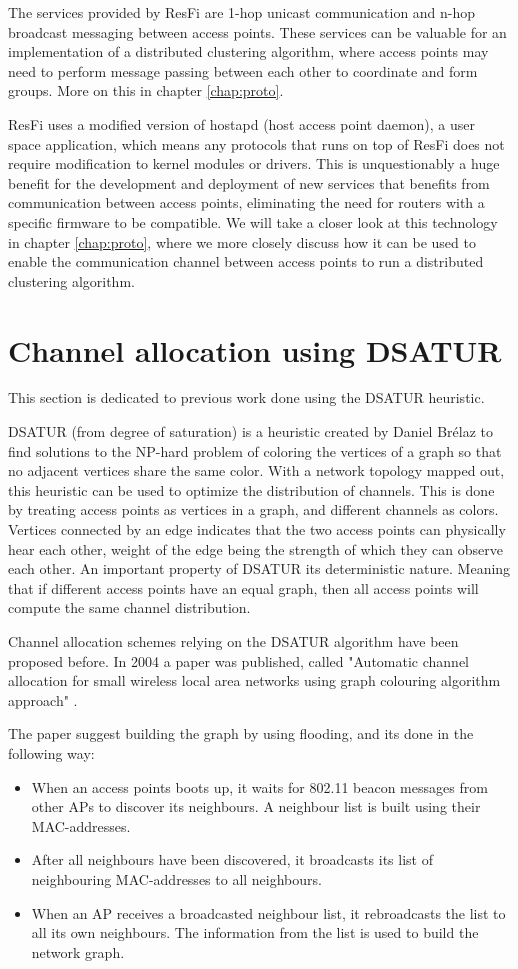The services provided by ResFi are 1-hop unicast communication and n-hop broadcast messaging between access points. These services can be valuable for an
implementation of a distributed clustering algorithm, where access points
may need to perform message passing between each other to coordinate and form groups. More on this in chapter \ref{chap:proto}.

ResFi uses a modified version of hostapd (host access point daemon), a user space application, which means any
protocols that runs on top of ResFi does not require modification to kernel modules or drivers. This is unquestionably a huge benefit for the development and deployment of
new services that benefits from communication between access points, eliminating the need for routers with a specific firmware to be compatible. 
We will take a closer look at this technology in chapter \ref{chap:proto}, where we more closely discuss how it can be used to enable the
communication channel between access points to run a distributed clustering algorithm. 


\section{Channel allocation using DSATUR} \label{chap:dsatur}
This section is dedicated to previous work done using the DSATUR heuristic.

DSATUR (from degree of saturation) is a heuristic created by Daniel Brélaz \cite{Brelaz} to find solutions to the NP-hard problem of coloring the vertices of a graph so that no adjacent vertices share the same color.  With a network topology mapped out, this heuristic can be used to optimize the distribution of channels. This is done by treating access points as vertices in a graph, and different channels as colors. Vertices connected by an edge indicates that the two access points can physically hear each other, weight of the edge being the strength of which they can observe each other.  An
important property of DSATUR its deterministic nature. Meaning that if different access points have an equal graph, then all access points will compute the same channel distribution.

Channel allocation schemes relying on the DSATUR algorithm have been proposed before. In 2004 a paper was published, called
"Automatic channel allocation for small wireless local area networks using graph colouring algorithm approach" \cite{mahonen}.

The paper suggest building the graph by using flooding, and its done in the following way:
\begin{itemize}
	\item When an access points boots up, it waits for 802.11 beacon messages from other APs to discover its neighbours. A neighbour list is built using their MAC-addresses. 
	\item After all neighbours have been discovered, it broadcasts its list of neighbouring MAC-addresses to all neighbours.  
	\item When an AP receives a broadcasted neighbour list, it rebroadcasts the list to all its own neighbours. The information from the list is used to build the network graph. 
\end{itemize}

